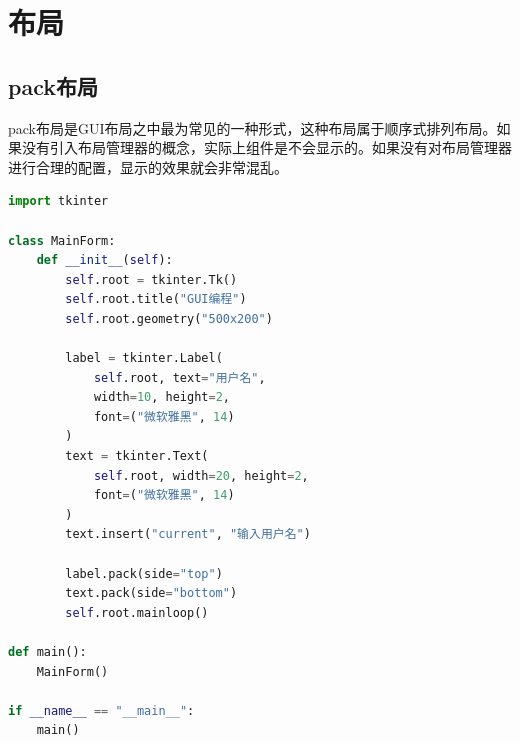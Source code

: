 \newpage

\section{布局}

\subsection{pack布局}

pack布局是GUI布局之中最为常见的一种形式，这种布局属于顺序式排列布局。如果没有引入布局管理器的概念，实际上组件是不会显示的。如果没有对布局管理器进行合理的配置，显示的效果就会非常混乱。

\begin{table}[H]
	\centering
	\caption{pack布局}
\end{table}

\vspace{0.5cm}


\begin{lstlisting}[language=Python]
import tkinter

class MainForm:
    def __init__(self):
        self.root = tkinter.Tk()
        self.root.title("GUI编程")
        self.root.geometry("500x200")

        label = tkinter.Label(
            self.root, text="用户名",
            width=10, height=2,
            font=("微软雅黑", 14)
        )
        text = tkinter.Text(
            self.root, width=20, height=2,
            font=("微软雅黑", 14)
        )
        text.insert("current", "输入用户名")

        label.pack(side="top")
        text.pack(side="bottom")
        self.root.mainloop()

def main():
    MainForm()

if __name__ == "__main__":
    main()
\end{lstlisting}

